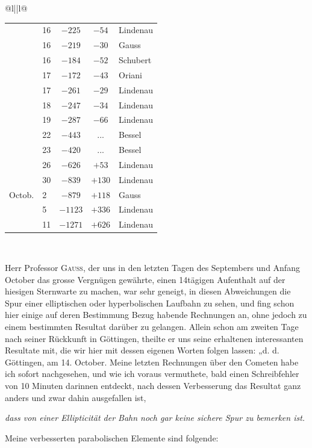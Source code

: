 \begin{center}
\begin{tabular}{@{}l||l@{}}
\begin{tabular}[t]{ll|c|c|l}
 & 16 & $-225$ & $-54$ & Lindenau \\
 & 16 & $-219$ & $-30$ & Gauss \\
 & 16 & $-184$ & $-52$ & Schubert \\
 & 17 & $-172$ & $-43$ & Oriani \\
 & 17 & $-261$ & $-29$ & Lindenau \\
 & 18 & $-247$ & $-34$ & Lindenau \\
 & 19 & $-287$ & $-66$ & Lindenau \\
 & 22 & $-443$ & .\;.\;. & Bessel \\
 & 23 & $-420$ & .\;.\;. & Bessel \\
 & 26 & $-626$ & $+53$ & Lindenau \\
 & 30 & $-839$ & $+130$ & Lindenau \\
Octob. & 2 & $-879$ & $+118$ & Gauss \\
 & 5 & $-1123$ & $+336$ & Lindenau \\
 & 11 & $-1271$ & $+626$ & Lindenau \\
\end{tabular}\\
\end{tabular}
\end{center}

\par\indent Herr Professor \textsc{Gauss}, der uns in den letzten Tagen des Septembers und Anfang October das grosse Vergnügen gewährte, einen 14tägigen Aufenthalt auf der hiesigen Sternwarte zu machen, war sehr geneigt, in diesen Abweichungen die Spur einer elliptischen oder hyperbolischen Laufbahn zu sehen, und fing schon hier einige auf deren Bestimmung Bezug habende Rechnungen an, ohne jedoch zu einem bestimmten Resultat darüber zu gelangen. Allein schon am zweiten Tage nach seiner Rückkunft in Göttingen, theilte er uns seine erhaltenen interessanten Resultate mit, die wir hier mit dessen eigenen Worten folgen lassen: „d. d. Göttingen, am 14. October. Meine letzten Rechnungen über den Cometen habe ich sofort nachgesehen, und wie ich voraus vermuthete, bald einen Schreibfehler von 10 Minuten darinnen entdeckt, nach dessen Verbesserung das Resultat ganz anders und zwar dahin ausgefallen ist,

\begin{center}
\emph{dass von einer Ellipticität der Bahn noch gar keine sichere Spur zu bemerken ist.}
\end{center}

\noindent Meine verbesserten parabolischen Elemente sind folgende:

